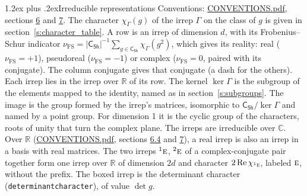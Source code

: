 \documentclass[10pt,a4paper]{article}
\makeatletter
\renewcommand\section{\@startsection{section}{1}{\z@}{-3ex plus -1ex minus -.2ex}%
  {1.2ex plus .2ex}{\normalfont\large\sffamily\bfseries\color{parttitle}}}
\numberwithin{equation}{section}
\newcommand{\grp}[1]{\mathsf{#1}}
\newcommand{\irr}[1]{\text{\normalfont\scshape #1}}
\newcommand{\conjpair}[1]{{}^{#1}}
\newcommand{\irchar}[1]{\chi_{#1}}
\newcommand{\fsind}{\nu_{\mathrm{FS}}}
\makeatother
\begin{document}
\section{Irreducible representations}\label{s:irreps}
Conventions: \href{../../CONVENTIONS.pdf}{CONVENTIONS.pdf}, sections \href{../../CONVENTIONS.pdf\#conv.6}{6} and \href{../../CONVENTIONS.pdf\#conv.7}{7}.
\leavevmode\label{n:function.character}\label{n:irrep.Gamma}The character $\irchar{\Gamma}(g)$ of the irrep $\Gamma$ on the class of $g$ is given in section~\ref{s:character_table}.
\leavevmode\label{n:index.dimension}\label{n:index.frobenius}\label{n:head.irrep}\label{n:head.reality}A row is an irrep of dimension $d$, with its Frobenius--Schur indicator $\fsind = |\grp{C_{5h}}|^{-1}\allowbreak\sum_{g\in\grp{C_{5h}}}\irchar{\Gamma}(g^2)$, which gives its reality: real ($\fsind = +1$), pseudoreal ($\fsind = -1$) or complex ($\fsind = 0$, paired with its conjugate). \label{n:head.conjugate}The column conjugate gives that conjugate (a dash for the others). \label{n:head.over.real}Each irrep lies in the irrep over $\mathbb{R}$ of its row. \label{n:head.kernel}The kernel $\ker\Gamma$ is the subgroup of the elements mapped to the identity, named as in section~\ref{s:subgroups}. \label{n:head.image}The image is the group formed by the irrep's matrices, isomorphic to $\grp{C_{5h}}/\ker\Gamma$ and named by a point group. For dimension 1 it is the cyclic group of the characters, roots of unity that turn the complex plane. The irreps are irreducible over $\mathbb{C}$. Over $\mathbb{R}$ (\href{../../CONVENTIONS.pdf}{CONVENTIONS.pdf}, sections \href{../../CONVENTIONS.pdf\#conv.6.4}{6.4} and \href{../../CONVENTIONS.pdf\#conv.7}{7}), a real irrep is also an irrep in a basis with real matrices. The two irreps $\conjpair{1}\irr{e}$, $\conjpair{2}\irr{e}$ of a complex-conjugate pair together form one irrep over $\mathbb{R}$ of dimension $2d$ and character $2\operatorname{Re}\irchar{\conjpair{1}\irr{e}}$, labeled $\irr{e}$, without the prefix. \label{n:mark.determinant}The boxed irrep is the determinant character (\texttt{determinantcharacter}), of value $\det g$.
\setlength{\emergencystretch}{2em}\par\setlength{\emergencystretch}{0pt}
\end{document}

